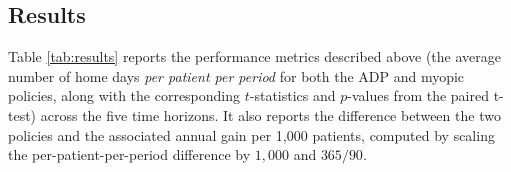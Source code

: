 \documentclass[12pt,a4paper]{article}
\begin{document}


 





\subsection{Results}



Table \ref{tab:results} reports the performance metrics described above (the average number of home days {\it per patient per period} for both the ADP and myopic policies, along with the corresponding $t$-statistics and $p$-values from the paired t-test) across the five time horizons. It also reports the difference between the two policies and the associated annual gain per 1,000 patients, computed by scaling the per-patient-per-period difference by $1{,}000$ and $365/90$.
\end{document}
